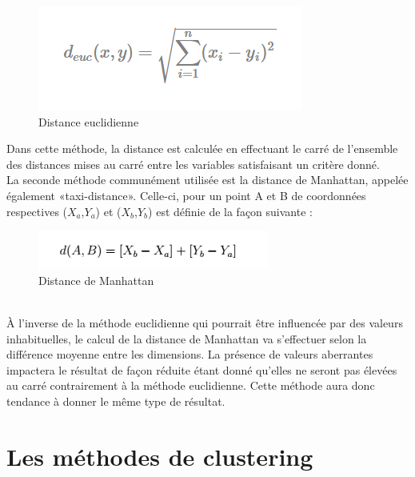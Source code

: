 \documentclass[memoire.tex]{subfiles}
\begin{document}
	\begin{figure}[h!]
		\centerline{\includegraphics[scale=0.8]{img/euclidienne_distance.png}}
		\caption{Distance euclidienne}
	\end{figure}
Dans cette méthode, la distance est calculée en effectuant le carré de l'ensemble des distances mises au carré entre les variables satisfaisant un critère donné.\\
La seconde méthode communément utilisée est la distance de Manhattan, appelée également «taxi-distance». Celle-ci, pour un point A et B de coordonnées respectives ($X_{a}$,$Y_{a}$) et ($X_{b}$,$Y_{b}$) est définie de la façon  suivante :\\
	\begin{figure}[h!]
		\centerline{\includegraphics[scale=0.8]{img/manhatan_distance.png}}
		\caption{Distance de Manhattan}
	\end{figure}\\
À l'inverse de la méthode euclidienne qui pourrait être influencée par des valeurs inhabituelles, le calcul de la distance de Manhattan va s'effectuer selon la différence moyenne entre les dimensions. La présence de valeurs aberrantes impactera le résultat de façon réduite étant donné qu'elles ne seront pas élevées au carré contrairement à la méthode euclidienne. Cette méthode aura donc tendance à donner le même type de résultat.
\newpage
\section{Les méthodes de clustering}
\end{document}
